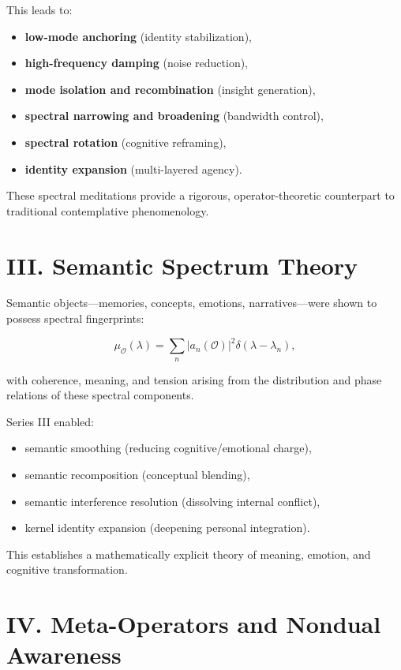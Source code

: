 \documentclass[12pt]{article}
\begin{document}
This leads to:

\begin{itemize}
    \item \textbf{low-mode anchoring} (identity stabilization),
    \item \textbf{high-frequency damping} (noise reduction),
    \item \textbf{mode isolation and recombination} (insight generation),
    \item \textbf{spectral narrowing and broadening} (bandwidth control),
    \item \textbf{spectral rotation} (cognitive reframing),
    \item \textbf{identity expansion} (multi-layered agency).
\end{itemize}

These spectral meditations provide a rigorous, operator-theoretic counterpart to
traditional contemplative phenomenology.

\section*{III. Semantic Spectrum Theory}

Semantic objects—memories, concepts, emotions, narratives—were shown to possess
spectral fingerprints:

\[
\mu_{\mathcal O}(\lambda)
    = \sum_n |a_n(\mathcal{O})|^2 \delta(\lambda - \lambda_n),
\]

with coherence, meaning, and tension arising from the distribution and phase
relations of these spectral components.

Series III enabled:

\begin{itemize}
    \item semantic smoothing (reducing cognitive/emotional charge),
    \item semantic recomposition (conceptual blending),
    \item semantic interference resolution (dissolving internal conflict),
    \item kernel identity expansion (deepening personal integration).
\end{itemize}

This establishes a mathematically explicit theory of meaning, emotion, and
cognitive transformation.

\section*{IV. Meta-Operators and Nondual Awareness}
\end{document}
